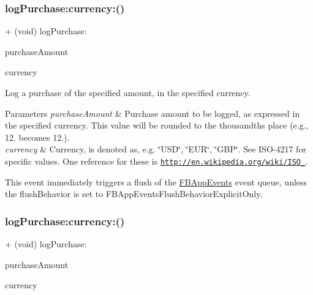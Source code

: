 \subsubsection{\texorpdfstring{log\+Purchase\+:currency\+:()}{logPurchase:currency:()}\hspace{0.1cm}{\footnotesize\ttfamily [2/5]}}
{\footnotesize\ttfamily + (void) log\+Purchase\+: \begin{DoxyParamCaption}\item[{(double)}]{purchase\+Amount }\item[{currency:(N\+S\+String $\ast$)}]{currency }\end{DoxyParamCaption}}

Log a purchase of the specified amount, in the specified currency.


\begin{DoxyParams}{Parameters}
{\em purchase\+Amount} & Purchase amount to be logged, as expressed in the specified currency. This value will be rounded to the thousandths place (e.\+g., 12. becomes 12.).\\
\hline
{\em currency} & Currency, is denoted as, e.\+g. \char`\"{}\+U\+S\+D\char`\"{}, \char`\"{}\+E\+U\+R\char`\"{}, \char`\"{}\+G\+B\+P\char`\"{}. See I\+S\+O-\/4217 for specific values. One reference for these is \href{http://en.wikipedia.org/wiki/ISO_4217}{\tt http\+://en.\+wikipedia.\+org/wiki/\+I\+S\+O\+\_}.\\
\hline
\end{DoxyParams}
This event immediately triggers a flush of the {\ttfamily \hyperlink{interfaceFBAppEvents}{F\+B\+App\+Events}} event queue, unless the {\ttfamily flush\+Behavior} is set to {\ttfamily F\+B\+App\+Events\+Flush\+Behavior\+Explicit\+Only}. \mbox{\label{interfaceFBAppEvents_a871b481d919104f7dbb67247b682e0fa}} 
\subsubsection{\texorpdfstring{log\+Purchase\+:currency\+:()}{logPurchase:currency:()}\hspace{0.1cm}{\footnotesize\ttfamily [3/5]}}
{\footnotesize\ttfamily + (void) log\+Purchase\+: \begin{DoxyParamCaption}\item[{(double)}]{purchase\+Amount }\item[{currency:(N\+S\+String $\ast$)}]{currency }\end{DoxyParamCaption}}

